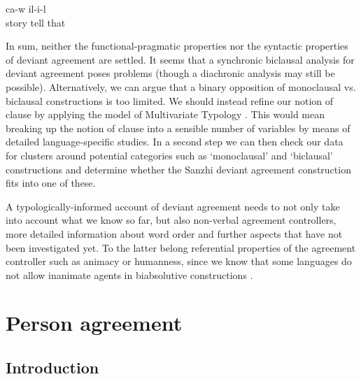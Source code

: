 \begin{exe}
	\ex	\label{ex:when, he was talking.}
		ca-w	il-i-l\\
		story	tell		that\\
	\glt	{}
\end{exe}

In sum, neither the functional-pragmatic properties nor the syntactic properties of deviant agreement are settled. It seems that a synchronic biclausal analysis for deviant agreement poses problems (though a diachronic analysis may still be possible). Alternatively, we can argue that a binary opposition of monoclausal vs. biclausal constructions is too limited. We should instead refine our notion of clause by applying the model of Multivariate Typology \citep{Bickel2011, Bickel2015}. This would mean breaking up the notion of clause into a sensible number of variables by means of detailed language-specific studies. In a second step we can then check our data for clusters around potential categories such as ‘monoclausal' and ‘biclausal' constructions and determine whether the Sanzhi deviant agreement construction fits into one of these.

A typologically-informed account of deviant agreement needs to not only take into account what we know so far, but also non-verbal agreement controllers, more detailed information about word order and further aspects that have not been investigated yet. To the latter belong referential properties of the agreement controller such as animacy or humanness, since we know that some languages do not allow inanimate agents in biabsolutive constructions \citet{Forker2012a}.



\section{Person agreement}
\label{sec:Person agreement}



\subsection{Introduction}
\label{ssec:IntroductionPersonAgreement}

